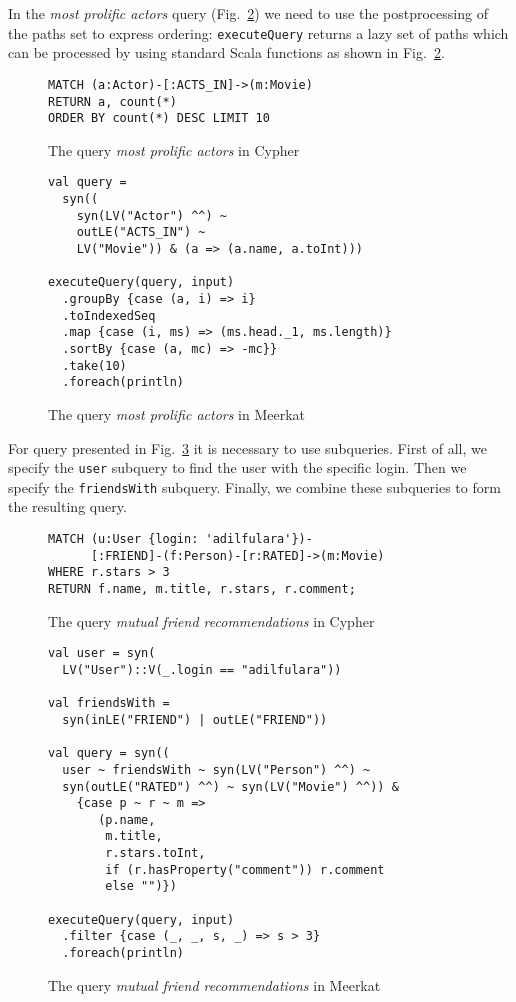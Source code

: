 In the \emph{most prolific actors} query (Fig.~\ref{fig:Q2_C}) we need to use the postprocessing of the paths set to express ordering: \lstinline{executeQuery} returns a lazy set of paths which can be processed by using standard Scala functions as shown in Fig.~\ref{fig:Q2_C}.

\begin{figure}[h]
\begin{lstlisting}
MATCH (a:Actor)-[:ACTS_IN]->(m:Movie)
RETURN a, count(*)
ORDER BY count(*) DESC LIMIT 10
\end{lstlisting}
\caption{The query \emph{most prolific actors} in Cypher}
\label{fig:Q2_C}
\end{figure}


\begin{figure}[h]
\begin{lstlisting}
val query =
  syn((
    syn(LV("Actor") ^^) ~
    outLE("ACTS_IN") ~
    LV("Movie")) & (a => (a.name, a.toInt)))

executeQuery(query, input)
  .groupBy {case (a, i) => i}
  .toIndexedSeq
  .map {case (i, ms) => (ms.head._1, ms.length)}
  .sortBy {case (a, mc) => -mc}}
  .take(10)
  .foreach(println)

\end{lstlisting}
\caption{The query \emph{most prolific actors} in Meerkat}
\label{fig:Q2_C}
\end{figure}

For query presented in Fig.~\ref{fig:Q4_C} it is necessary to use subqueries.
First of all, we specify the \lstinline{user} subquery to find the user with the specific login.
Then we specify the \lstinline{friendsWith} subquery.
Finally, we combine these subqueries to form the resulting query.

\begin{figure}[h]
\begin{lstlisting}
MATCH (u:User {login: 'adilfulara'})-
      [:FRIEND]-(f:Person)-[r:RATED]->(m:Movie)
WHERE r.stars > 3
RETURN f.name, m.title, r.stars, r.comment;
\end{lstlisting}
\caption{The query \emph{mutual friend recommendations} in Cypher}
\label{fig:Q4_C}
\end{figure}


\begin{figure}[h]
\begin{lstlisting}
val user = syn(
  LV("User")::V(_.login == "adilfulara"))

val friendsWith =
  syn(inLE("FRIEND") | outLE("FRIEND"))

val query = syn((
  user ~ friendsWith ~ syn(LV("Person") ^^) ~
  syn(outLE("RATED") ^^) ~ syn(LV("Movie") ^^)) &
    {case p ~ r ~ m =>
       (p.name,
        m.title,
        r.stars.toInt,
        if (r.hasProperty("comment")) r.comment
        else "")})

executeQuery(query, input)
  .filter {case (_, _, s, _) => s > 3}
  .foreach(println)

\end{lstlisting}
\caption{The query \emph{mutual friend recommendations} in Meerkat}
\label{fig:Q4_M}
\end{figure}


